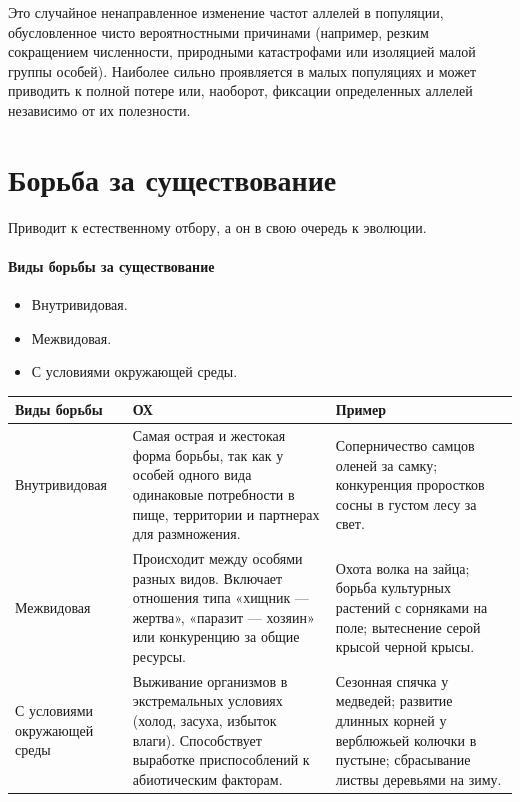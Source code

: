 \documentclass[12pt]{article}
\begin{document}
	\begin{definition}
		Это случайное ненаправленное изменение частот аллелей в популяции, обусловленное чисто вероятностными причинами (например, резким сокращением численности, природными катастрофами или изоляцией малой группы особей). Наиболее сильно проявляется в малых популяциях и может приводить к полной потере или, наоборот, фиксации определенных аллелей независимо от их полезности.
	\end{definition}
	
	\section{Борьба за существование}
	
	Приводит к естественному отбору, а он в свою очередь к эволюции.
	
	\paragraph{Виды борьбы за существование}
	
	\begin{itemize}
		\item Внутривидовая.
		\item Межвидовая.
		\item С условиями окружающей среды.
	\end{itemize}
	
	\begin{table}[H]
		\centering
		\caption{Борьба за существование}
		
		\begin{xltabular}{\textwidth}{|X|X|X|}
			\hline
			\textbf{Виды борьбы} & \textbf{ОХ} & \textbf{Пример}\\
			\hline
			Внутривидовая & Самая острая и жестокая форма борьбы, так как у особей одного вида одинаковые потребности в пище, территории и партнерах для размножения. & Соперничество самцов оленей за самку; конкуренция проростков сосны в густом лесу за свет. \\
			\hline
			Межвидовая & Происходит между особями разных видов. Включает отношения типа «хищник — жертва», «паразит — хозяин» или конкуренцию за общие ресурсы. & Охота волка на зайца; борьба культурных растений с сорняками на поле; вытеснение серой крысой черной крысы. \\
			\hline
			С условиями окружающей среды & Выживание организмов в экстремальных условиях (холод, засуха, избыток влаги). Способствует выработке приспособлений к абиотическим факторам. & Сезонная спячка у медведей; развитие длинных корней у верблюжьей колючки в пустыне; сбрасывание листвы деревьями на зиму. \\
			\hline
		\end{xltabular}
	\end{table}
	
\end{document}
